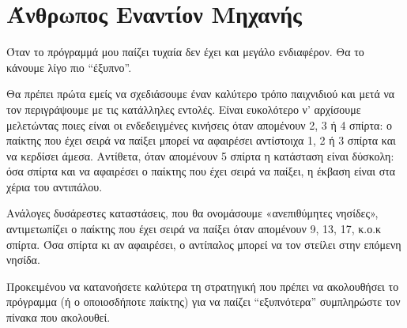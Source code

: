\documentclass[a4paper,11pt,oneside]{book}
\begin{document}
\section{Άνθρωπος Εναντίον Μηχανής}
Όταν το πρόγραμμά μου παίζει τυχαία δεν έχει και μεγάλο ενδιαφέρον. Θα το κάνουμε λίγο πιο ``έξυπνο''.

\begin{step}
Θα πρέπει πρώτα εμείς να σχεδιάσουμε έναν καλύτερο τρόπο παιχνιδιού και μετά να τον περιγράψουμε με τις κατάλληλες εντολές.
Είναι ευκολότερο ν' αρχίσουμε μελετώντας ποιες είναι οι ενδεδειγμένες κινήσεις όταν απομένουν 2, 3 ή 4 σπίρτα: ο παίκτης που έχει σειρά να παίξει μπορεί να αφαιρέσει αντίστοιχα 1, 2 ή 3 σπίρτα και να κερδίσει άμεσα. Αντίθετα, όταν απομένουν 5 σπίρτα η κατάσταση είναι δύσκολη: όσα σπίρτα και να αφαιρέσει ο παίκτης που έχει σειρά να παίξει, η έκβαση είναι στα χέρια του αντιπάλου. 

Ανάλογες δυσάρεστες καταστάσεις, που θα ονομάσουμε «ανεπιθύμητες νησίδες», αντιμετωπίζει ο παίκτης που έχει σειρά να παίξει όταν απομένουν 9, 13, 17, κ.ο.κ σπίρτα. Όσα σπίρτα κι αν αφαιρέσει, ο αντίπαλος μπορεί να τον στείλει στην επόμενη νησίδα.

Προκειμένου να κατανοήσετε καλύτερα τη στρατηγική που πρέπει να ακολουθήσει το πρόγραμμα (ή ο οποιοσδήποτε παίκτης) για να παίζει ``εξυπνότερα'' συμπληρώστε τον πίνακα που ακολουθεί. \vspace{-6pt}


\end{step}
\end{document}
